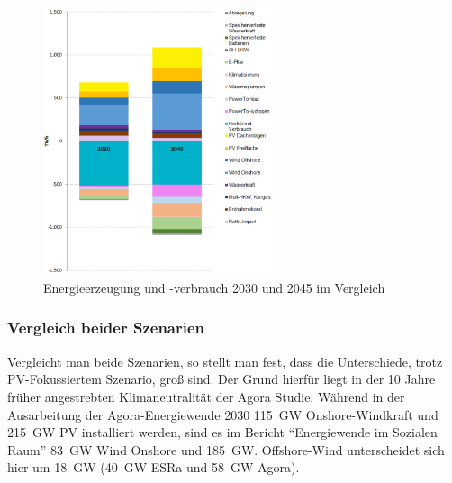 				\begin{figure}[H]
				\centering
				\includegraphics[page=1, clip, width=0.6\textwidth]{./anhang/Strombilanz Frauenhofer.png}
				\caption{Energieerzeugung und -verbrauch 2030 und 2045 im Vergleich}
				\label{Abb. Energiesystem 2045}
			\end{figure}
		
		\subsubsection{Vergleich beider Szenarien}
		Vergleicht man beide Szenarien, so stellt man fest, dass die Unterschiede, trotz PV-Fokussiertem Szenario, groß sind. Der Grund hierfür liegt in der 10 Jahre früher angestrebten Klimaneutralität der Agora Studie.  Während in der Ausarbeitung der Agora-Energiewende 2030 \SI{115}{\giga \watt} Onshore-Windkraft und \SI{215}{\giga \watt} PV installiert werden, sind es im Bericht "`Energiewende im Sozialen Raum"' \SI{83}{\giga \watt} Wind Onshore und \SI{185}{\giga \watt}. Offshore-Wind unterscheidet sich hier um \SI{18}{\giga \watt} (\SI{40}{\giga \watt} ESRa und \SI{58}{\giga \watt} Agora). 
		\clearpage
		
		
		